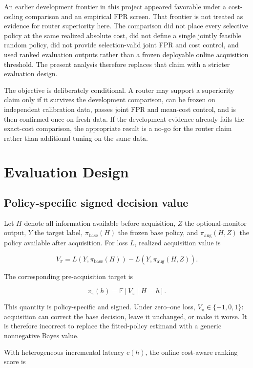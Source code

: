 \documentclass[11pt]{article}
\begin{document}
An earlier development frontier in this project appeared favorable
under a cost-ceiling comparison and an empirical FPR screen. That
frontier is not treated as evidence for router superiority here.
The comparison did not place every selective policy at the same
realized absolute cost, did not define a single jointly feasible
random policy, did not provide selection-valid joint FPR and cost
control, and used ranked evaluation outputs rather than a frozen
deployable online acquisition threshold. The present analysis
therefore replaces that claim with a stricter evaluation design.

The objective is deliberately conditional. A router may support a
superiority claim only if it survives the development comparison,
can be frozen on independent calibration data, passes joint FPR and
mean-cost control, and is then confirmed once on fresh data. If the
development evidence already fails the exact-cost comparison, the
appropriate result is a no-go for the router claim rather than
additional tuning on the same data.

\section{Evaluation Design}

\subsection{Policy-specific signed decision value}

Let \(H\) denote all information available before acquisition,
\(Z\) the optional-monitor output, \(Y\) the target label,
\(\pi_{\mathrm{base}}(H)\) the frozen base policy, and
\(\pi_{\mathrm{aug}}(H,Z)\) the policy available after acquisition.
For loss \(L\), realized acquisition value is

\[
V_{\pi}
=
L\!\left(
Y,\pi_{\mathrm{base}}(H)
\right)
-
L\!\left(
Y,\pi_{\mathrm{aug}}(H,Z)
\right).
\]

The corresponding pre-acquisition target is

\[
v_{\pi}(h)
=
\mathbb{E}
\left[
V_{\pi}\mid H=h
\right].
\]

This quantity is policy-specific and signed. Under zero--one loss,
\(V_{\pi}\in\{-1,0,1\}\): acquisition can correct the base decision,
leave it unchanged, or make it worse. It is therefore incorrect to
replace the fitted-policy estimand with a generic nonnegative Bayes
value.

With heterogeneous incremental latency \(c(h)\), the online
cost-aware ranking score is
\end{document}
